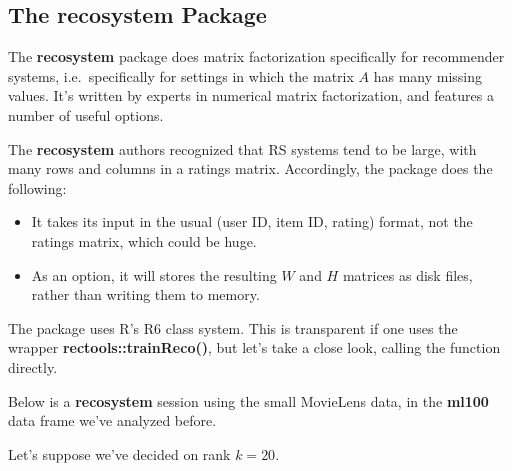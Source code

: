\subsection{The recosystem Package}

The \textbf{recosystem} package does matrix factorization specifically
for recommender systems, i.e.\ specifically for settings in which the
matrix $A$ has many missing values.  It's written by experts in
numerical matrix factorization, and features a number of useful options.

The \textbf{recosystem} authors recognized that RS systems tend to be
large, with many rows and columns in a ratings matrix.  Accordingly, the
package does the following:

\begin{itemize}

\item It takes its input in the usual (user ID, item ID, rating) format,
not the ratings matrix, which could be huge.

\item As an option, it will stores the resulting $W$ and $H$ matrices as
disk files, rather than writing them to memory.

\end{itemize} 

The package uses R's R6 class system.  This is transparent if one uses
the wrapper \textbf{rectools::trainReco()}, but let's take a close look,
calling the function directly.


Below is a \textbf{recosystem} session using the small MovieLens data,
in the \textbf{ml100} data frame we've analyzed before.

Let's suppose we've decided on rank $k = 20$. 

